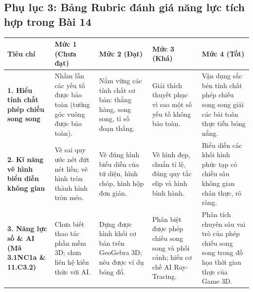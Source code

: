 \documentclass[12pt, a4paper]{article}
\begin{document}
\subsection*{Phụ lục 3: Bảng Rubric đánh giá năng lực tích hợp trong Bài 14}

\begin{center}
\begin{tabularx}{\linewidth}{|p{3.2cm}|X|X|X|X|}
\hline
\textbf{Tiêu chí} & \textbf{Mức 1 (Chưa đạt)} & \textbf{Mức 2 (Đạt)} & \textbf{Mức 3 (Khá)} & \textbf{Mức 4 (Tốt)} \\
\hline
\textbf{1. Hiểu tính chất phép chiếu song song} & Nhầm lẫn các yếu tố được bảo toàn (tưởng góc vuông được bảo toàn). & Nắm vững các tính chất cơ bản: thẳng hàng, song song, tỉ số đoạn thẳng. & Giải thích thuyết phục vì sao một số yếu tố không bảo toàn. & Vận dụng sắc bén tính chất phép chiếu song song giải các bài toán thực tiễn bóng nắng. \\
\hline
\textbf{2. Kĩ năng vẽ hình biểu diễn không gian} & Vẽ sai quy ước nét đứt nét liền; vẽ hình tròn thành hình tròn méo. & Vẽ đúng hình biểu diễn của tứ diện, hình chóp, hình hộp đơn giản. & Vẽ hình đẹp, chuẩn tỉ lệ, đúng quy tắc elip và hình bình hành. & Biểu diễn các khối hình phức tạp có chiều sâu không gian chân thực, rõ ràng. \\
\hline
\textbf{3. Năng lực số \& AI (Mã 3.1NC1a \& 11.C3.2)} & Chưa biết thao tác phần mềm 3D; chưa liên hệ kiến thức với AI. & Dựng được hình khối cơ bản trên GeoGebra 3D; nêu được ví dụ bóng đổ. & Phân biệt được phép chiếu song song và phối cảnh; hiểu cơ chế AI Ray-Tracing. & Phân tích chuyên sâu vai trò của phép chiếu song song trong đồ họa thời gian thực của Game 3D. \\
\hline
\end{tabularx}
\end{center}
\end{document}
